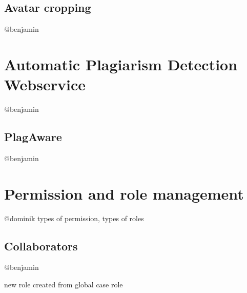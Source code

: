 \subsection{Avatar cropping}
@benjamin

\section{Automatic Plagiarism Detection Webservice}
@benjamin
\subsection{PlagAware}
@benjamin

\section{Permission and role management}
@dominik
types of permission, types of roles

\subsection{Collaborators}
@benjamin

new role created from global case role